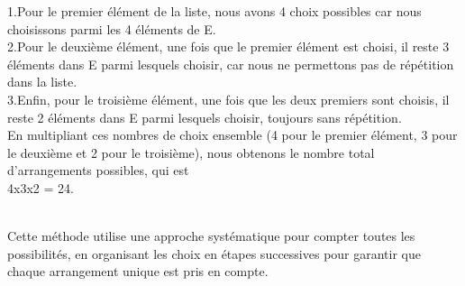 \documentclass[12pt]{article}
\begin{document}
    1.Pour le premier élément de la liste, nous avons 4 choix possibles car nous choisissons parmi les 4 éléments de E.\\

    2.Pour le deuxième élément, une fois que le premier élément est choisi, il reste 3 éléments dans E parmi lesquels choisir, car nous ne permettons pas de répétition dans la liste.\\

    3.Enfin, pour le troisième élément, une fois que les deux premiers sont choisis, il reste 2 éléments dans E  parmi lesquels choisir, toujours sans répétition.\\

En multipliant ces nombres de choix ensemble (4 pour le premier élément, 3 pour le deuxième et 2 pour le troisième), nous obtenons le nombre total d'arrangements possibles, qui est\\ 4x3x2 = 24.\\
\\
Cette méthode utilise une approche systématique pour compter toutes les possibilités, en organisant les choix en étapes successives pour garantir que chaque arrangement unique est pris en compte.
\end{document}
